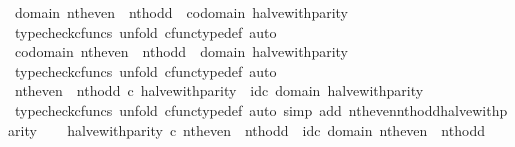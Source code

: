 \begin{isabellebody}
\ {\isachardoublequoteopen}domain\ {\isacharparenleft}{\kern0pt}nth{\isacharunderscore}{\kern0pt}even\ {\isasymamalg}\ nth{\isacharunderscore}{\kern0pt}odd{\isacharparenright}{\kern0pt}\ {\isacharequal}{\kern0pt}\ codomain\ halve{\isacharunderscore}{\kern0pt}with{\isacharunderscore}{\kern0pt}parity{\isachardoublequoteclose}\isanewline
\ \ \ \ \isamarkupfalse%
\ {\isacharparenleft}{\kern0pt}typecheck{\isacharunderscore}{\kern0pt}cfuncs{\isacharcomma}{\kern0pt}\ unfold\ cfunc{\isacharunderscore}{\kern0pt}type{\isacharunderscore}{\kern0pt}def{\isacharcomma}{\kern0pt}\ auto{\isacharparenright}{\kern0pt}\isanewline
\ \ \isamarkupfalse%
\ {\isachardoublequoteopen}codomain\ {\isacharparenleft}{\kern0pt}nth{\isacharunderscore}{\kern0pt}even\ {\isasymamalg}\ nth{\isacharunderscore}{\kern0pt}odd{\isacharparenright}{\kern0pt}\ {\isacharequal}{\kern0pt}\ domain\ halve{\isacharunderscore}{\kern0pt}with{\isacharunderscore}{\kern0pt}parity{\isachardoublequoteclose}\isanewline
\ \ \ \ \isamarkupfalse%
\ {\isacharparenleft}{\kern0pt}typecheck{\isacharunderscore}{\kern0pt}cfuncs{\isacharcomma}{\kern0pt}\ unfold\ cfunc{\isacharunderscore}{\kern0pt}type{\isacharunderscore}{\kern0pt}def{\isacharcomma}{\kern0pt}\ auto{\isacharparenright}{\kern0pt}\isanewline
\ \ \isamarkupfalse%
\ {\isachardoublequoteopen}nth{\isacharunderscore}{\kern0pt}even\ {\isasymamalg}\ nth{\isacharunderscore}{\kern0pt}odd\ {\isasymcirc}\isactrlsub c\ halve{\isacharunderscore}{\kern0pt}with{\isacharunderscore}{\kern0pt}parity\ {\isacharequal}{\kern0pt}\ id\isactrlsub c\ {\isacharparenleft}{\kern0pt}domain\ halve{\isacharunderscore}{\kern0pt}with{\isacharunderscore}{\kern0pt}parity{\isacharparenright}{\kern0pt}{\isachardoublequoteclose}\isanewline
\ \ \ \ \isamarkupfalse%
\ {\isacharparenleft}{\kern0pt}typecheck{\isacharunderscore}{\kern0pt}cfuncs{\isacharcomma}{\kern0pt}\ unfold\ cfunc{\isacharunderscore}{\kern0pt}type{\isacharunderscore}{\kern0pt}def{\isacharcomma}{\kern0pt}\ auto\ simp\ add{\isacharcolon}{\kern0pt}\ nth{\isacharunderscore}{\kern0pt}even{\isacharunderscore}{\kern0pt}nth{\isacharunderscore}{\kern0pt}odd{\isacharunderscore}{\kern0pt}halve{\isacharunderscore}{\kern0pt}with{\isacharunderscore}{\kern0pt}parity{\isacharparenright}{\kern0pt}\isanewline
\ \ \isamarkupfalse%
\ {\isachardoublequoteopen}halve{\isacharunderscore}{\kern0pt}with{\isacharunderscore}{\kern0pt}parity\ {\isasymcirc}\isactrlsub c\ nth{\isacharunderscore}{\kern0pt}even\ {\isasymamalg}\ nth{\isacharunderscore}{\kern0pt}odd\ {\isacharequal}{\kern0pt}\ id\isactrlsub c\ {\isacharparenleft}{\kern0pt}domain\ {\isacharparenleft}{\kern0pt}nth{\isacharunderscore}{\kern0pt}even\ {\isasymamalg}\ nth{\isacharunderscore}{\kern0pt}odd{\isacharparenright}{\kern0pt}{\isacharparenright}{\kern0pt}{\isachardoublequoteclose}\isanewline

\end{isabellebody}
